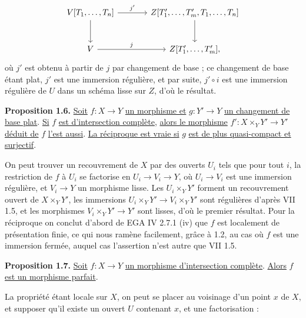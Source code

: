 
\[
\begin{tikzcd}[column sep=large,row sep=large]
V[T_1,\ldots,T_n] \arrow[r,"j'"] \arrow[d] & Z[T'_1,\ldots,T'_m,T_1,\ldots,T_n] \arrow[d]\\
V \arrow[r,"j"] & Z[T'_1,\ldots,T'_m],
\end{tikzcd}
\]
où $j'$ est obtenu à partir de $j$ par changement de base ; ce changement de base étant plat, $j'$ est une immersion régulière, et par suite, $j'\circ i$ est une immersion régulière de $U$ dans un schéma lisse sur $Z$, d'où le résultat.

\textbf{Proposition 1.6.} \uline{Soit} $f:X\to Y$ \uline{un morphisme et} $g:Y'\to Y$ \uline{un changement de base plat}. \uline{Si} $f$ \uline{est d'intersection complète}, \uline{alors le morphisme} $f':X\times_Y Y'\to Y'$ \uline{déduit de} $f$ \uline{l'est aussi}. \uline{La réciproque est vraie si} $g$ \uline{est de plus quasi-compact et surjectif}.

On peut trouver un recouvrement de $X$ par des ouverts $U_i$ tels que pour tout $i$, la restriction de $f$ à $U_i$ se factorise en $U_i\longrightarrow V_i\longrightarrow Y$, où $U_i\to V_i$ est une immersion régulière, et $V_i\to Y$ un morphisme lisse. Les $U_i\times_Y Y'$ forment un recouvrement ouvert de $X\times_Y Y'$, les immersions $U_i\times_Y Y'\longrightarrow V_i\times_Y Y'$ sont régulières d'après VII 1.5, et les morphismes $V_i\times_Y Y'\to Y'$ sont lisses, d'où le premier résultat. Pour la réciproque on conclut d'abord de EGA IV 2.7.1 (iv) que $f$ est localement de présentation finie, ce qui nous ramène facilement, grâce à 1.2, au cas où $f$ est une immersion fermée, auquel cas l'assertion n'est autre que VII 1.5.

\textbf{Proposition 1.7.} \uline{Soit} $f:X\to Y$ \uline{un morphisme d'intersection complète}. \uline{Alors} $f$ \uline{est un morphisme parfait}.

La propriété étant locale sur $X$, on peut se placer au voisinage d'un point $x$ de $X$, et supposer qu'il existe un ouvert $U$ contenant $x$, et une factorisation :

